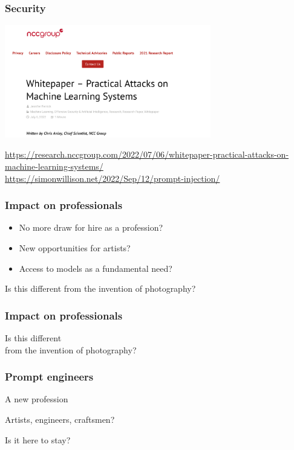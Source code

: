 \documentclass[17pt,aspectratio=169,hyperref={pdfusetitle,colorlinks,allcolors=olive}]{beamer}
\begin{document}
\begin{frame}[fragile]
  \frametitle{Security}

  \includegraphics[width=9cm]{figs/ml-attacks}

  {\scriptsize
    \url{https://research.nccgroup.com/2022/07/06/whitepaper-practical-attacks-on-machine-learning-systems/} \\
    \url{https://simonwillison.net/2022/Sep/12/prompt-injection/} \\
    }
  
\end{frame}

\begin{frame}[fragile]
  \frametitle{Impact on professionals}

  \begin{itemize}
  \item No more draw for hire as a profession?
  \item New opportunities for artists?
  \item Access to models as a fundamental need?
  \end{itemize}

  
  Is this different from the invention of photography?
\end{frame}

\begin{frame}[fragile]
  \frametitle{Impact on professionals}

  {\Large
  Is this different \\
  from the invention of photography? \\
}

\end{frame}

\begin{frame}[fragile]
  \frametitle{Prompt engineers}

  A new profession

  \vspace{.5cm}

  Artists, engineers, craftsmen?

  \vspace{.5cm}

  Is it here to stay?
  
\end{frame}
\end{document}

